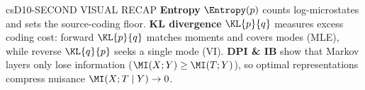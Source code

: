 \documentclass[../../../../master.tex]{subfiles}
\begin{document}
\begin{cscolumns}
\begin{cscard}{csD}{10-SECOND VISUAL RECAP}
  \sffamily\footnotesize
  \textbf{Entropy} $\Entropy(p)$ counts log-microstates and sets the source-coding floor.
  \textbf{KL divergence} $\KL{p}{q}$ measures excess coding cost: forward $\KL{p}{q}$ matches moments and covers modes (MLE), while reverse $\KL{q}{p}$ seeks a single mode (VI).
  \textbf{DPI \& IB} show that Markov layers only lose information ($\MI(X;Y)\ge\MI(T;Y)$), so optimal representations compress nuisance $\MI(X;T\mid Y)\to 0$.
\end{cscard}
\end{cscolumns}

\csend
\end{document}
